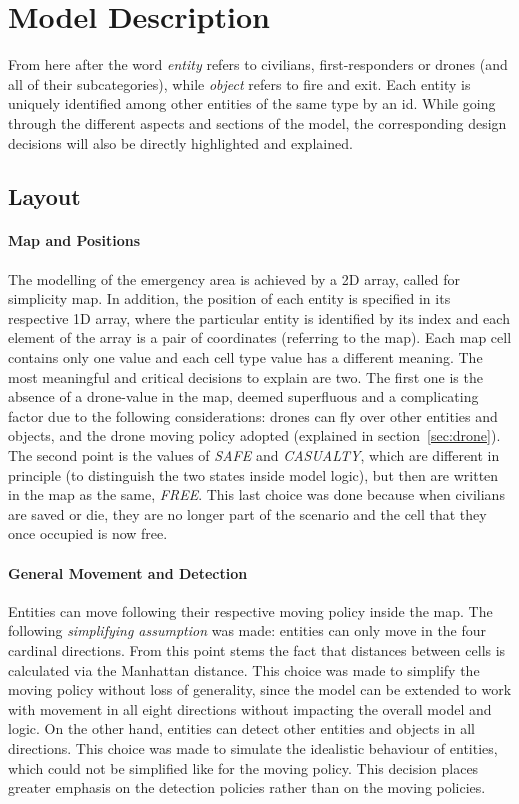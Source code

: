 
\section{Model Description}
From here after the word \textit{entity} refers to civilians, first-responders or drones (and all of their subcategories), while \textit{object} refers to fire and exit. Each entity is uniquely identified among other entities of the same type by an id. While going through the different aspects and sections of the model, the corresponding design decisions will also be directly highlighted and explained.


\subsection{Layout}
\paragraph{Map and Positions}
\label{sec:map}
The modelling of the emergency area is achieved by a 2D array, called for simplicity map. In addition, the position of each entity is specified in its respective 1D array, where the particular entity is identified by its index and each element of the array is a pair of coordinates (referring to the map).\newline
Each map cell contains only one value and each cell type value has a different meaning. The most meaningful and critical decisions to explain are two. The first one is the absence of a drone-value in the map, deemed superfluous and a complicating factor due to the following considerations: drones can fly over other entities and objects, and the drone moving policy adopted (explained in section~\ref{sec:drone}). The second point is the values of \textit{SAFE} and \textit{CASUALTY}, which are different in principle (to distinguish the two states inside model logic), but then are written in the map as the same, \textit{FREE}. This last choice was done because when civilians are saved or die, they are no longer part of the scenario and the cell that they once occupied is now free.
\paragraph{General Movement and Detection}
Entities can move following their respective moving policy inside the map. The following \textit{simplifying assumption} was made: entities can only move in the four cardinal directions. From this point stems the fact that distances between cells is calculated via the Manhattan distance. This choice was made to simplify the moving policy without loss of generality, since the model can be extended to work with movement in all eight directions without impacting the overall model and logic. On the other hand, entities can detect other entities and objects in all directions. This choice was made to simulate the idealistic behaviour of entities, which could not be simplified like for the moving policy. This decision places greater emphasis on the detection policies rather than on the moving policies.


